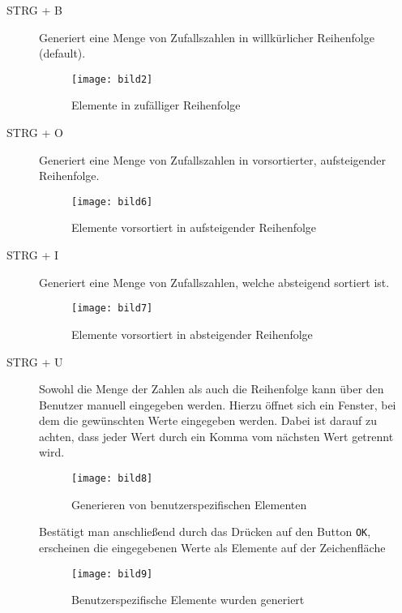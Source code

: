 \begin{description}
\item[STRG + B] Generiert eine Menge von Zufallszahlen in willkürlicher Reihenfolge (default).

\begin{figure}[!htb]
    \centering
      \texttt{[image: bild2]}
    \caption{Elemente in zufälliger Reihenfolge}
\end{figure}

\item[STRG + O] Generiert eine Menge von Zufallszahlen in vorsortierter, aufsteigender Reihenfolge.

\begin{figure}[!htb]
    \centering
      \texttt{[image: bild6]}
    \caption{Elemente vorsortiert in aufsteigender Reihenfolge}
\end{figure}

\item[STRG + I] Generiert eine Menge von Zufallszahlen, welche absteigend sortiert ist.

\begin{figure}[!htb]
    \centering
      \texttt{[image: bild7]}
    \caption{Elemente vorsortiert in absteigender Reihenfolge}
\end{figure}

\item[STRG + U] Sowohl die Menge der Zahlen als auch die Reihenfolge kann über den Benutzer manuell eingegeben werden. Hierzu öffnet sich ein Fenster, bei dem die gewünschten Werte eingegeben werden. Dabei ist darauf zu achten, dass jeder Wert durch ein Komma vom nächsten Wert getrennt wird.

\begin{figure}[!htb]
    \centering
      \texttt{[image: bild8]}
    \caption{Generieren von benutzerspezifischen Elementen}
\end{figure}

Bestätigt man anschließend durch das Drücken auf den Button \texttt{OK}, erscheinen die eingegebenen Werte als Elemente auf der Zeichenfläche

\begin{figure}[!htb]
    \centering
      \texttt{[image: bild9]}
    \caption{Benutzerspezifische Elemente wurden generiert}
\end{figure}
\end{description}





